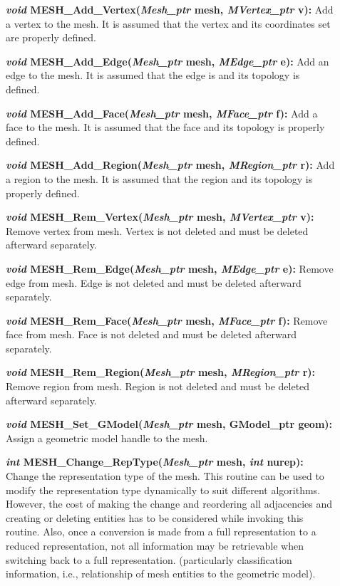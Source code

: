 \documentclass[12pt]{article}
\begin{document}
\begin{description}
\item[]\textbf{\textit{void} MESH\_Add\_Vertex(\textit{Mesh\_ptr} mesh,
\textit{MVertex\_ptr} v):} Add a vertex to the mesh. It is assumed that
the vertex and its coordinates set are properly defined.

\item[]\textbf{\textit{void} MESH\_Add\_Edge(\textit{Mesh\_ptr} mesh,
\textit{MEdge\_ptr} e):} Add an edge to the mesh. It is assumed that
the edge is and its topology is defined.

\item[]\textbf{\textit{void} MESH\_Add\_Face(\textit{Mesh\_ptr} mesh,
\textit{MFace\_ptr} f):} Add a face to the mesh. It is assumed that the
face and its topology is properly defined.

\item[]\textbf{\textit{void} MESH\_Add\_Region(\textit{Mesh\_ptr} mesh,
\textit{MRegion\_ptr} r):} Add a region to the mesh. It is assumed that
the region and its topology is properly defined.

\item[]\textbf{\textit{void} MESH\_Rem\_Vertex(\textit{Mesh\_ptr} mesh,
\textit{MVertex\_ptr} v):} Remove vertex from mesh. Vertex is not
deleted and must be deleted afterward separately.

\item[]\textbf{\textit{void} MESH\_Rem\_Edge(\textit{Mesh\_ptr} mesh,
\textit{MEdge\_ptr} e):} Remove edge from mesh. Edge is not deleted and
must be deleted afterward separately.

\item[]\textbf{\textit{void} MESH\_Rem\_Face(\textit{Mesh\_ptr} mesh,
\textit{MFace\_ptr} f):} Remove face from mesh. Face is not deleted and
must be deleted afterward separately.

\item[]\textbf{\textit{void} MESH\_Rem\_Region(\textit{Mesh\_ptr} mesh,
\textit{MRegion\_ptr} r):} Remove region from mesh. Region is not deleted and must be deleted afterward separately.

\item[]\textbf{\textit{void} MESH\_Set\_GModel(\textit{Mesh\_ptr} mesh,
GModel\_ptr geom):} Assign a geometric model handle to the mesh.

\item[]\textbf{\textit{int} MESH\_Change\_RepType(\textit{Mesh\_ptr} mesh,
\textit{int} nurep):} Change the representation type of the mesh. This
routine can be used to modify the representation type dynamically to
suit different algorithms.  However, the cost of making the change and
reordering all adjacencies and creating or deleting entities has to be
considered while invoking this routine. Also, once a conversion is
made from a full representation to a reduced representation, not all
information may be retrievable when switching back to a full
representation.  (particularly classification information, i.e.,
relationship of mesh entities to the geometric model).

\end{description}
\end{document}

